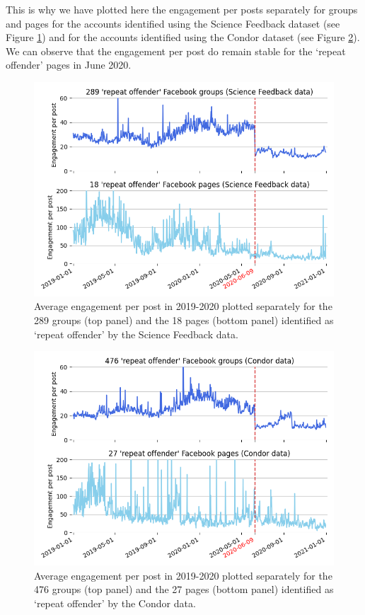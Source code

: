 \documentclass[review]{elsarticle}
\begin{document}
{This is why we have plotted here the engagement per posts separately for groups and pages for the accounts identified using the Science Feedback dataset (see Figure \ref{engagement_groups_and_pages_sf}) and for the accounts identified using the Condor dataset (see Figure \ref{engagement_groups_and_pages_condor}). 
We can observe that the engagement per post do remain stable for the `repeat offender' pages in June 2020.

\begin{figure}[!h]
\centering
\includegraphics[scale=0.5]{./../figure/supplementary_engagement_groups_and_pages_sf.png}
\caption{
Average engagement per post in 2019-2020 plotted separately for the 289 groups (top panel) and the 18 pages (bottom panel) identified as `repeat offender' by the Science Feedback data.
}
\label{engagement_groups_and_pages_sf}
\end{figure}

\begin{figure}[!h]
\centering
\includegraphics[scale=0.5]{./../figure/supplementary_engagement_groups_and_pages_condor.png}
\caption{
Average engagement per post in 2019-2020 plotted separately for the 476 groups (top panel) and the 27 pages (bottom panel) identified as `repeat offender' by the Condor data.
}
\label{engagement_groups_and_pages_condor}
\end{figure}

}
\end{document}
